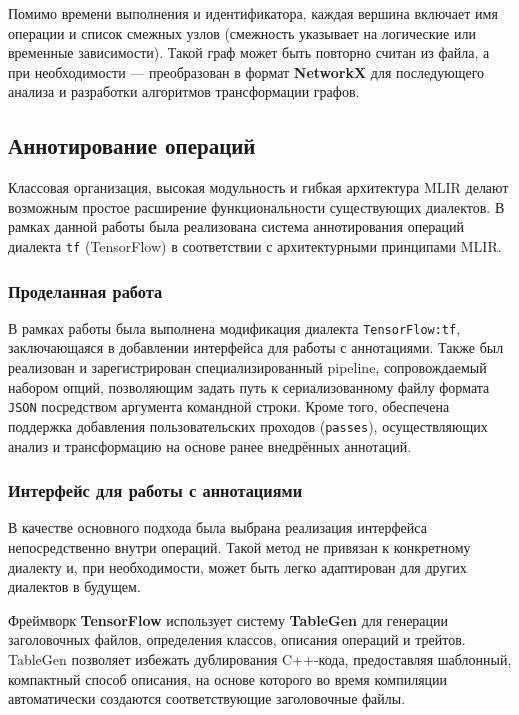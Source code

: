 Помимо времени выполнения и идентификатора, каждая вершина включает имя операции и список смежных узлов (смежность указывает на логические или временные зависимости).
Такой граф может быть повторно считан из файла, а при необходимости — преобразован в формат \textbf{NetworkX} для последующего анализа и разработки алгоритмов трансформации графов.

\subsection{Аннотирование операций}

Классовая организация, высокая модульность и гибкая архитектура MLIR делают возможным простое расширение функциональности существующих диалектов.
В рамках данной работы была реализована система аннотирования операций диалекта \texttt{tf} (TensorFlow) в соответствии с архитектурными принципами MLIR.

\subsubsection{Проделанная работа}

В рамках работы была выполнена модификация диалекта \texttt{TensorFlow:tf}, заключающаяся в добавлении интерфейса для работы с аннотациями.
Также был реализован и зарегистрирован специализированный pipeline, сопровождаемый набором опций, позволяющим задать путь к сериализованному файлу формата \texttt{JSON} посредством аргумента командной строки.
Кроме того, обеспечена поддержка добавления пользовательских проходов (\texttt{passes}), осуществляющих анализ и трансформацию на основе ранее внедрённых аннотаций.

\subsubsection{Интерфейс для работы с аннотациями}

В качестве основного подхода была выбрана реализация интерфейса непосредственно внутри операций. Такой метод не привязан к конкретному диалекту и, при необходимости, может быть легко адаптирован для других диалектов в будущем.

Фреймворк \textbf{TensorFlow} использует систему \textbf{TableGen} для генерации заголовочных файлов, определения классов, описания операций и трейтов. TableGen позволяет избежать дублирования C++-кода, предоставляя шаблонный, компактный способ описания, на основе которого во время компиляции автоматически создаются соответствующие заголовочные файлы.

